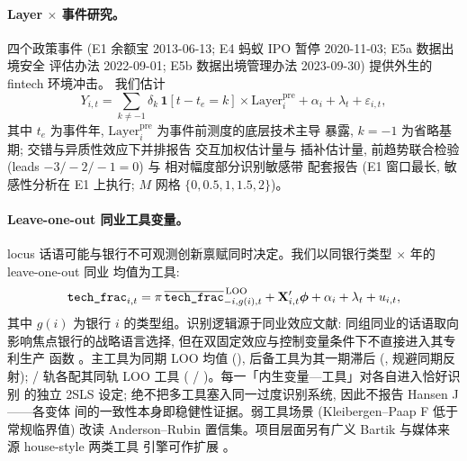 \paragraph{Layer $\times$ 事件研究。}
四个政策事件 (E1 余额宝 2013-06-13; E4 蚂蚁 IPO 暂停 2020-11-03; E5a 数据出境安全
评估办法 2022-09-01; E5b 数据出境管理办法 2023-09-30) 提供外生的 fintech 环境冲击。
我们估计
\begin{equation}\label{eq:eventstudy}
Y_{i,t} = \sum_{k \neq -1} \delta_k\, \mathbf{1}[t - t_e = k] \times
\mathrm{Layer}^{\mathrm{pre}}_{i} + \alpha_i + \lambda_t + \varepsilon_{i,t},
\end{equation}
其中 $t_e$ 为事件年, $\mathrm{Layer}^{\mathrm{pre}}_i$ 为事件前测度的底层技术主导
暴露, $k=-1$ 为省略基期; 交错与异质性效应下并排报告 \textcite{sunabraham2021eventstudy}
交互加权估计量与 \textcite{borusyak2024revisiting} 插补估计量, 前趋势联合检验
(leads $-3/-2/-1=0$) 与 \textcite{rambachan2023honestdid} 相对幅度部分识别敏感带
配套报告 (E1 窗口最长, 敏感性分析在 E1 上执行; $M$ 网格 $\{0,0.5,1,1.5,2\}$)。

\paragraph{Leave-one-out 同业工具变量。}
locus 话语可能与银行不可观测创新禀赋同时决定。我们以同银行类型 $\times$ 年的
leave-one-out 同业  均值为工具:
\begin{equation}\label{eq:iv}
\texttt{tech\_frac}_{i,t} = \pi\, \overline{\texttt{tech\_frac}}^{\,\mathrm{LOO}}_{-i,g(i),t}
 + \mathbf{X}_{i,t}'\boldsymbol{\phi} + \alpha_i + \lambda_t + u_{i,t},
\end{equation}
其中 $g(i)$ 为银行 $i$ 的类型组。识别逻辑源于同业效应文献: 同组同业的话语取向
影响焦点银行的战略语言选择, 但在双固定效应与控制变量条件下不直接进入其专利生产
函数 \parencite{manski1993reflection,leary2014peereffects}。主工具为同期 LOO 均值
(), 后备工具为其一期滞后
(, 规避同期反射);  / 
轨各配其同轨 LOO 工具 ( /
)。每一「内生变量—工具」对各自进入恰好识别
的独立 2SLS 设定; 绝不把多工具塞入同一过度识别系统, 因此不报告 Hansen J——各变体
间的一致性本身即稳健性证据。弱工具场景 (Kleibergen--Paap F 低于常规临界值) 改读
Anderson--Rubin 置信集。项目层面另有广义 Bartik 与媒体来源 house-style 两类工具
引擎可作扩展 \parencite{goldsmithpinkham2020bartik,borusyak2022shiftshare}。

